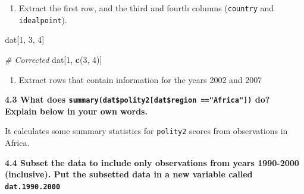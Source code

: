 \documentclass[]{book}
\newenvironment{Shaded}{\begin{snugshade}}{\end{snugshade}}
\newcommand{\KeywordTok}[1]{\textcolor[rgb]{0.13,0.29,0.53}{\textbf{#1}}}
\newcommand{\DecValTok}[1]{\textcolor[rgb]{0.00,0.00,0.81}{#1}}
\newcommand{\FloatTok}[1]{\textcolor[rgb]{0.00,0.00,0.81}{#1}}
\newcommand{\StringTok}[1]{\textcolor[rgb]{0.31,0.60,0.02}{#1}}
\newcommand{\CommentTok}[1]{\textcolor[rgb]{0.56,0.35,0.01}{\textit{#1}}}
\newcommand{\OperatorTok}[1]{\textcolor[rgb]{0.81,0.36,0.00}{\textbf{#1}}}
\newcommand{\NormalTok}[1]{#1}
\providecommand{\tightlist}{%
  \setlength{\itemsep}{0pt}\setlength{\parskip}{0pt}}
\begin{document}
\begin{enumerate}
\def\labelenumi{\arabic{enumi}.}
\setcounter{enumi}{3}
\tightlist
\item
  Extract the first row, and the third and fourth columns
  (\texttt{country} and \texttt{idealpoint}).
\end{enumerate}

\begin{Shaded}
\begin{Highlighting}[]
\NormalTok{dat[}\DecValTok{1}\NormalTok{, }\DecValTok{3}\NormalTok{, }\DecValTok{4}\NormalTok{]}

\CommentTok{# Corrected}
\NormalTok{dat[}\DecValTok{1}\NormalTok{, }\KeywordTok{c}\NormalTok{(}\DecValTok{3}\NormalTok{, }\DecValTok{4}\NormalTok{)]}
\end{Highlighting}
\end{Shaded}

\begin{enumerate}
\def\labelenumi{\arabic{enumi}.}
\setcounter{enumi}{4}
\tightlist
\item
  Extract rows that contain information for the years 2002 and 2007
\end{enumerate}

\begin{Shaded}
\end{Shaded}

\textbf{4.3 What does
\texttt{summary(dat\$polity2{[}dat\$region\ =="Africa"{]})} do? Explain
below in your own words.}

It calculates some summary statistics for \texttt{polity2} scores from
observations in Africa.

\textbf{4.4 Subset the data to include only observations from years
1990-2000 (inclusive). Put the subsetted data in a new variable called
\texttt{dat.1990.2000}}

\begin{Shaded}
\end{Shaded}
\end{document}
